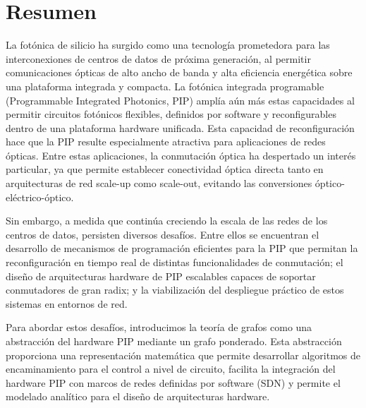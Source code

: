 

\chapter*{Resumen}
La fotónica de silicio ha surgido como una tecnología prometedora para las interconexiones de centros de datos de próxima generación, al permitir comunicaciones ópticas de alto ancho de banda y alta eficiencia energética sobre una plataforma integrada y compacta.
La fotónica integrada programable (Programmable Integrated Photonics, PIP) amplía aún más estas capacidades al permitir circuitos fotónicos flexibles, definidos por software y reconfigurables dentro de una plataforma hardware unificada.
Esta capacidad de reconfiguración hace que la PIP resulte especialmente atractiva para aplicaciones de redes ópticas.
Entre estas aplicaciones, la conmutación óptica ha despertado un interés particular, ya que permite establecer conectividad óptica directa tanto en arquitecturas de red scale-up como scale-out, evitando las conversiones óptico-eléctrico-óptico.

Sin embargo, a medida que continúa creciendo la escala de las redes de los centros de datos, persisten diversos desafíos.
Entre ellos se encuentran el desarrollo de mecanismos de programación eficientes para la PIP que permitan la reconfiguración en tiempo real de distintas funcionalidades de conmutación;
el diseño de arquitecturas hardware de PIP escalables capaces de soportar conmutadores de gran radix;
y la viabilización del despliegue práctico de estos sistemas en entornos de red.

Para abordar estos desafíos, introducimos la teoría de grafos como una abstracción del hardware PIP mediante un grafo ponderado.
Esta abstracción proporciona una representación matemática que permite desarrollar algoritmos de encaminamiento para el control a nivel de circuito, facilita la integración del hardware PIP con marcos de redes definidas por software (SDN) y permite el modelado analítico para el diseño de arquitecturas hardware.

